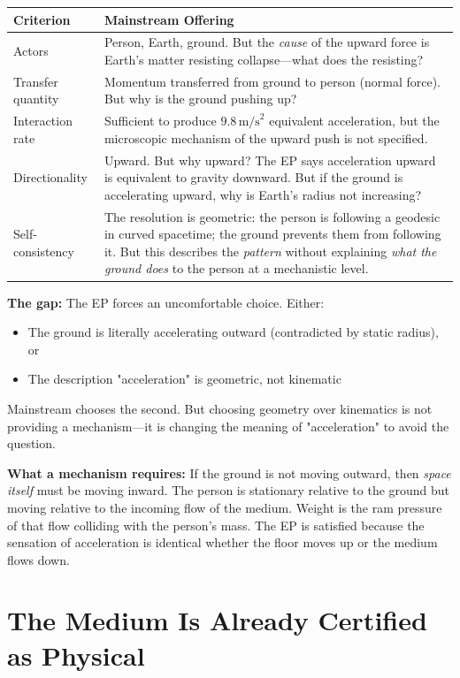 \documentclass[12pt, a4paper]{article}
\begin{document}
\begin{center}
\begin{tabular}{|p{3cm}|p{10cm}|}
\hline
\textbf{Criterion} & \textbf{Mainstream Offering} \\
\hline
Actors & Person, Earth, ground. But the \textit{cause} of the upward force is Earth's matter resisting collapse—what does the resisting? \\
\hline
Transfer quantity & Momentum transferred from ground to person (normal force). But why is the ground pushing up? \\
\hline
Interaction rate & Sufficient to produce \( 9.8 \, \text{m/s}^2 \) equivalent acceleration, but the microscopic mechanism of the upward push is not specified. \\
\hline
Directionality & Upward. But why upward? The EP says acceleration upward is equivalent to gravity downward. But if the ground is accelerating upward, why is Earth's radius not increasing? \\
\hline
Self-consistency & The resolution is geometric: the person is following a geodesic in curved spacetime; the ground prevents them from following it. But this describes the \textit{pattern} without explaining \textit{what the ground does} to the person at a mechanistic level. \\
\hline
\end{tabular}
\end{center}

\textbf{The gap:} The EP forces an uncomfortable choice. Either:
\begin{itemize}
    \item The ground is literally accelerating outward (contradicted by static radius), or
    \item The description "acceleration" is geometric, not kinematic
\end{itemize}
Mainstream chooses the second. But choosing geometry over kinematics is not providing a mechanism—it is changing the meaning of "acceleration" to avoid the question.

\textbf{What a mechanism requires:} If the ground is not moving outward, then \textit{space itself} must be moving inward. The person is stationary relative to the ground but moving relative to the incoming flow of the medium. Weight is the ram pressure of that flow colliding with the person's mass. The EP is satisfied because the sensation of acceleration is identical whether the floor moves up or the medium flows down.

\section{The Medium Is Already Certified as Physical}
\label{sec:medium_certified}
\end{document}
